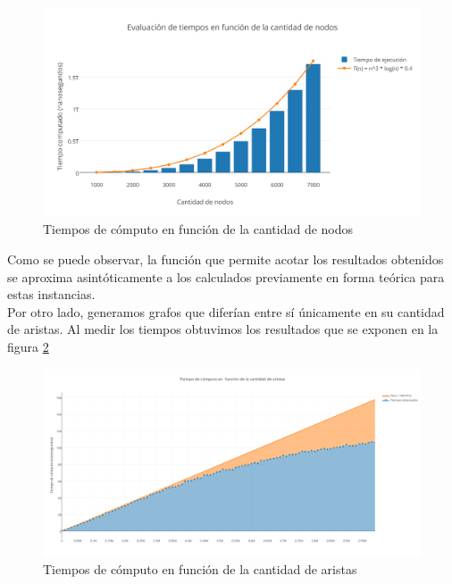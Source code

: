  \begin{figure}[H]
    \begin{center}
  	\includegraphics[width=18cm]{imagenes/Ej3/nodostiempo.png}
 	\caption{Tiempos de cómputo en función de la cantidad de nodos}
 	\label{nodostiempo}
    \end{center}
  \end{figure}

Como se puede observar, la función que permite acotar los resultados obtenidos se aproxima asintóticamente a los calculados previamente en forma teórica para estas instancias.\\
Por otro lado, generamos grafos que diferían entre sí únicamente en su cantidad de aristas. Al medir los tiempos obtuvimos los resultados que se exponen en la figura \ref{aristastiempo}

 \begin{figure}[H]
    \begin{center}
  	\includegraphics[width=18cm]{imagenes/Ej3/aristastiempo.png}
 	\caption{Tiempos de cómputo en función de la cantidad de aristas}
 	\label{aristastiempo}
    \end{center}
  \end{figure}

